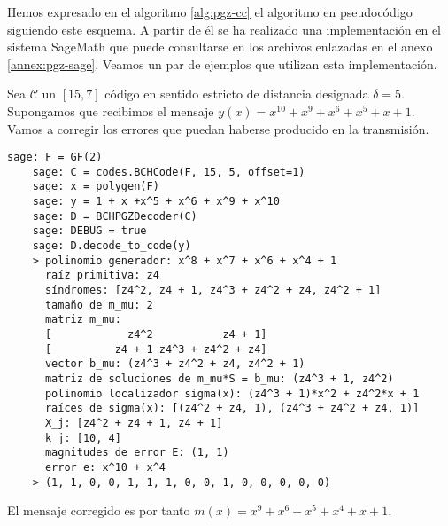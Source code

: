 Hemos expresado en el algoritmo \ref{alg:pgz-cc} el algoritmo  en pseudocódigo siguiendo este esquema.
A partir de él se ha realizado una implementación en el sistema SageMath que puede consultarse en los archivos enlazadas en el anexo \ref{annex:pgz-sage}.
Veamos un par de ejemplos que utilizan esta implementación.

\begin{example}
  Sea \(\mathcal C\) un \([15, 7]\) código  en sentido estricto de distancia designada \(\delta = 5\).
  Supongamos que recibimos el mensaje \(y(x) = x^{10} + x^9 + x^6 + x^5 + x + 1\).
  Vamos a corregir los errores que puedan haberse producido en la transmisión.
  \begin{lstlisting}[gobble=4]
    sage: F = GF(2)
    sage: C = codes.BCHCode(F, 15, 5, offset=1)
    sage: x = polygen(F)
    sage: y = 1 + x +x^5 + x^6 + x^9 + x^10
    sage: D = BCHPGZDecoder(C)
    sage: DEBUG = true
    sage: D.decode_to_code(y)
    > polinomio generador: x^8 + x^7 + x^6 + x^4 + 1
      raíz primitiva: z4
      síndromes: [z4^2, z4 + 1, z4^3 + z4^2 + z4, z4^2 + 1]
      tamaño de m_mu: 2
      matriz m_mu: 
      [            z4^2           z4 + 1]
      [          z4 + 1 z4^3 + z4^2 + z4]
      vector b_mu: (z4^3 + z4^2 + z4, z4^2 + 1)
      matriz de soluciones de m_mu*S = b_mu: (z4^3 + 1, z4^2)
      polinomio localizador sigma(x): (z4^3 + 1)*x^2 + z4^2*x + 1
      raíces de sigma(x): [(z4^2 + z4, 1), (z4^3 + z4^2 + z4, 1)]
      X_j: [z4^2 + z4 + 1, z4 + 1]
      k_j: [10, 4]
      magnitudes de error E: (1, 1)
      error e: x^10 + x^4
    > (1, 1, 0, 0, 1, 1, 1, 0, 0, 1, 0, 0, 0, 0, 0)
  \end{lstlisting}
  El mensaje corregido es por tanto \(m(x) = x^9 + x^6 + x^5 + x^4 + x + 1\).
\end{example}

